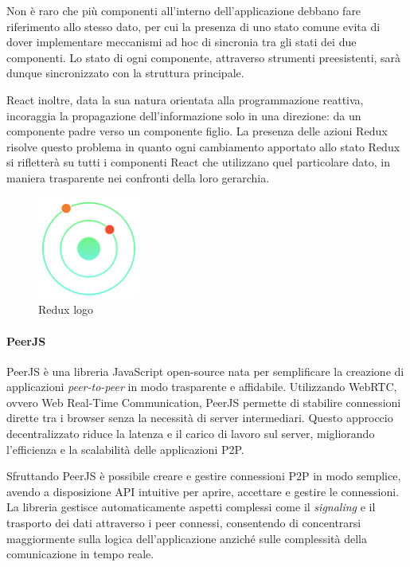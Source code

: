 Non è raro che più componenti all'interno dell'applicazione debbano fare riferimento allo stesso dato, per cui la presenza di uno stato comune evita di dover implementare meccanismi ad hoc di sincronia tra gli stati dei due componenti. Lo stato di ogni componente, attraverso strumenti preesistenti, sarà dunque sincronizzato con la struttura principale.

React inoltre, data la sua natura orientata alla programmazione reattiva, incoraggia la propagazione dell'informazione solo in una direzione: da un componente padre verso un componente figlio. La presenza delle azioni Redux risolve questo problema in quanto ogni cambiamento apportato allo stato Redux si rifletterà su tutti i componenti React che utilizzano quel particolare dato, in maniera trasparente nei confronti della loro gerarchia.

\begin{figure}[H]
\centering
\includegraphics[width=0.3\textwidth]{img/logos/redux_devtool.jpg}
\caption{Redux logo}
\label{fig:redux}
\end{figure}

\paragraph{PeerJS}

PeerJS è una libreria JavaScript open-source nata per semplificare la creazione di applicazioni \emph{peer-to-peer} in modo trasparente e affidabile. Utilizzando WebRTC, ovvero Web Real-Time Communication, PeerJS permette di stabilire connessioni dirette tra i browser senza la necessità di server intermediari. Questo approccio decentralizzato riduce la latenza e il carico di lavoro sul server, migliorando l'efficienza e la scalabilità delle applicazioni P2P.

Sfruttando PeerJS è possibile creare e gestire connessioni P2P in modo semplice, avendo a disposizione API intuitive per aprire, accettare e gestire le connessioni. La libreria gestisce automaticamente aspetti complessi come il \emph{signaling} e il trasporto dei dati attraverso i peer connessi, consentendo di concentrarsi maggiormente sulla logica dell'applicazione anziché sulle complessità della comunicazione in tempo reale.

